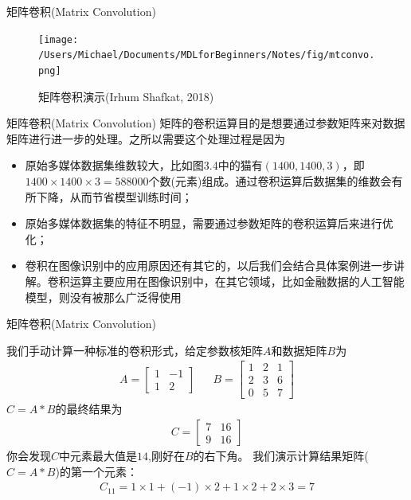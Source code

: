 \documentclass[handout]{beamer}
\begin{document}
\begin{frame}{矩阵卷积(Matrix Convolution)}
\begin{figure}[H]
	\centering
	\texttt{[image: /Users/Michael/Documents/MDLforBeginners/Notes/fig/mtconvo.png]}
	\caption{矩阵卷积演示(Irhum Shafkat, 2018)}
\end{figure}
\end{frame}

\begin{frame}{矩阵卷积(Matrix Convolution)}
矩阵的卷积运算目的是想要通过参数矩阵来对数据矩阵进行进一步的处理。之所以需要这个处理过程是因为
	\begin{itemize}
	\setlength\itemsep{1em}
		\item 原始多媒体数据集维数较大，比如图3.4中的猫有$(1400, 1400, 3)$，即$1400 \times 1400 \times 3 = 588000$个数(元素)组成。通过卷积运算后数据集的维数会有所下降，从而节省模型训练时间；
		\item 原始多媒体数据集的特征不明显，需要通过参数矩阵的卷积运算后来进行优化；
		\item 卷积在图像识别中的应用原因还有其它的，以后我们会结合具体案例进一步讲解。卷积运算主要应用在图像识别中，在其它领域，比如金融数据的人工智能模型，则没有被那么广泛得使用
	\end{itemize}
\end{frame}

\begin{frame}{矩阵卷积(Matrix Convolution)}
\begin{example}
{\footnotesize
我们手动计算一种标准的卷积形式，给定参数核矩阵$A$和数据矩阵$B$为
\begin{align*}
	A = \begin{bmatrix}
		1 & -1 \\
		1 & 2 
	\end{bmatrix} & & B= \begin{bmatrix}
		1 & 2 & 1 \\
		2 & 3 & 6 \\
		0 & 5 & 7 
	\end{bmatrix}
\end{align*}	
$C=A*B$的最终结果为\begin{align*}
	C = \begin{bmatrix}
		7 & 16 \\
		9 & 16 
	\end{bmatrix}
\end{align*} 你会发现$C$中元素最大值是$14$,刚好在$B$的右下角。
我们演示计算结果矩阵($C = A*B$)的第一个元素：
\begin{align*}
	C_{11} = 1\times 1 + (-1) \times 2 + 1 \times 2 + 2 \times 3 = 7 
\end{align*}
}
\end{example}
\end{frame}
\end{document}
